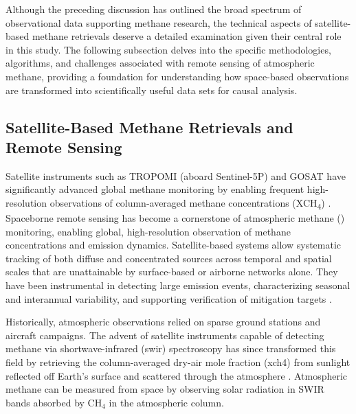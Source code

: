 Although the preceding discussion has outlined the broad spectrum of observational data supporting methane research, the technical aspects of satellite-based methane retrievals deserve a detailed examination given their central role in this study. The following subsection delves into the specific methodologies, algorithms, and challenges associated with remote sensing of atmospheric methane, providing a foundation for understanding how space-based observations are transformed into scientifically useful data sets for causal analysis.

\subsection{Satellite-Based Methane Retrievals and Remote Sensing}
\label{sec:satellite-retrievals}

Satellite instruments such as TROPOMI (aboard Sentinel-5P) and GOSAT have significantly advanced global methane monitoring by enabling frequent high-resolution observations of column-averaged methane concentrations (XCH\textsubscript{4}) \cite{Schneising2019, Lorente2021}. Spaceborne remote sensing has become a cornerstone of atmospheric methane () monitoring, enabling global, high-resolution observation of methane concentrations and emission dynamics. Satellite-based systems allow systematic tracking of both diffuse and concentrated sources across temporal and spatial scales that are unattainable by surface-based or airborne networks alone. They have been instrumental in detecting large emission events, characterizing seasonal and interannual variability, and supporting verification of mitigation targets \cite{eo_portal_iss_2023, ghgsat_ghgsat_2023, writer_methane_tracking_2023}.

Historically, atmospheric  observations relied on sparse ground stations and aircraft campaigns. The advent of satellite instruments capable of detecting methane via shortwave-infrared (\gls{swir}) spectroscopy has since transformed this field by retrieving the column-averaged dry-air mole fraction (\gls{xch4}) from sunlight reflected off Earth's surface and scattered through the atmosphere \cite{Karoff2023}. Atmospheric methane can be measured from space by observing solar radiation in SWIR bands absorbed by CH$_4$ in the atmospheric column.

